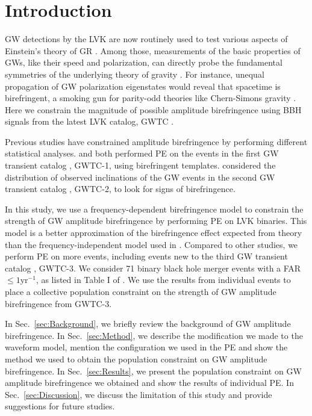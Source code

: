 \documentclass[aps,prd,twocolumn,superscriptaddress,preprintnumbers,floatfix,nofootinbib]{revtex4-2}
\begin{document}
\section{Introduction}
\label{sec:Introduction}
\Ac{GW} detections by the \ac{LVK} \citep{LIGO, Virgo, KAGRA} are now routinely used to test various aspects of Einstein's theory of \ac{GR} \citep{LIGOScientific:2016lio,LIGOScientific:2018dkp,LIGOScientific:2021sio}.
Among those, measurements of the basic properties of \acp{GW}, like their speed and polarization, can directly probe the fundamental symmetries of the underlying theory of gravity \citep{Will:2018bme}.
For instance, unequal propagation of \ac{GW} polarization eigenstates would reveal that spacetime is birefringent, a smoking gun for parity-odd theories like Chern-Simons gravity \citep{Jackiw:2003pm,Alexander:2009tp,Sopuerta:2009iy}.
Here we constrain the magnitude of possible amplitude birefringence using \ac{BBH} signals from the latest \ac{LVK} catalog, GWTC \citep{GWTC-3}.

Previous studies have constrained amplitude birefringence by performing different statistical analyses.
\citet{Yamada_2020} and \citet{Wang_2021} both performed \ac{PE} on the events in the first \ac{GW} transient catalog \citep{GWTC-1}, GWTC-1, using birefringent templates.
\citet{Okounkova_2022} considered the distribution of observed inclinations of the \ac{GW} events in the second \ac{GW} transient catalog \citep{GWTC-2}, GWTC-2, to look for signs of birefringence.

In this study, we use a frequency-dependent birefringence model to constrain the strength of \ac{GW} amplitude birefringence by performing \ac{PE} on \ac{LVK} binaries.
This model is a better approximation of the birefringence effect expected from theory than the frequency-independent model used in \citet{Okounkova_2022}.
Compared to other studies, we perform \ac{PE} on more events, including events new to the third \ac{GW} transient catalog \citep{GWTC-3}, GWTC-3.
We consider 71 binary black hole merger events with a \ac{FAR} $\leq1\mathrm{yr^{-1}}$, as listed in Table I of \citet{GWTC-3_population}.
We use the results from individual events to place a collective population constraint on the strength of \ac{GW} amplitude birefringence from GWTC-3.

In Sec.~\ref{sec:Background}, we briefly review the background of \ac{GW} amplitude birefringence.
In Sec.~\ref{sec:Method}, we describe the modification we made to the waveform model, mention the configuration we used in the \ac{PE} and show the method we used to obtain the population constraint on \ac{GW} amplitude birefringence.
In Sec.~\ref{sec:Results}, we present the population constraint on \ac{GW} amplitude birefringence we obtained and show the results of individual \ac{PE}.
In Sec.~\ref{sec:Discussion}, we discuss the limitation of this study and provide suggestions for future studies.
\end{document}
